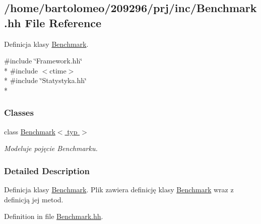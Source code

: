 \hypertarget{_benchmark_8hh}{\subsection{/home/bartolomeo/209296/prj/inc/\-Benchmark.hh File Reference}
\label{_benchmark_8hh}
}


Definicja klasy \hyperlink{class_benchmark}{Benchmark}.  


{\ttfamily \#include \char`\"{}Framework.\-hh\char`\"{}}\\*
{\ttfamily \#include $<$ctime$>$}\\*
{\ttfamily \#include \char`\"{}Statystyka.\-hh\char`\"{}}\\*
\subsubsection*{Classes}
\begin{DoxyCompactItemize}
\item 
class \hyperlink{class_benchmark}{Benchmark$<$ typ $>$}
\begin{DoxyCompactList}\small\item\em Modeluje pojęcie Benchmarku. \end{DoxyCompactList}\end{DoxyCompactItemize}


\subsubsection{Detailed Description}
Definicja klasy \hyperlink{class_benchmark}{Benchmark}. Plik zawiera definicję klasy \hyperlink{class_benchmark}{Benchmark} wraz z definicją jej metod. 

Definition in file \hyperlink{_benchmark_8hh_source}{Benchmark.\-hh}.

